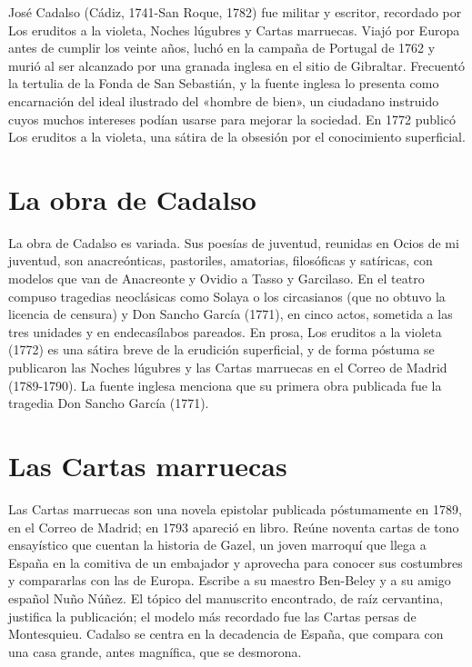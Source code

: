 \documentclass{book}
\begin{document}
José Cadalso (Cádiz, 1741-San Roque, 1782) fue militar y escritor, recordado por Los eruditos a la violeta, Noches lúgubres y Cartas marruecas. Viajó por Europa antes de cumplir los veinte años, luchó en la campaña de Portugal de 1762 y murió al ser alcanzado por una granada inglesa en el sitio de Gibraltar. Frecuentó la tertulia de la Fonda de San Sebastián, y la fuente inglesa lo presenta como encarnación del ideal ilustrado del «hombre de bien», un ciudadano instruido cuyos muchos intereses podían usarse para mejorar la sociedad. En 1772 publicó Los eruditos a la violeta, una sátira de la obsesión por el conocimiento superficial.


\section{La obra de Cadalso}

La obra de Cadalso es variada. Sus poesías de juventud, reunidas en Ocios de mi juventud, son anacreónticas, pastoriles, amatorias, filosóficas y satíricas, con modelos que van de Anacreonte y Ovidio a Tasso y Garcilaso. En el teatro compuso tragedias neoclásicas como Solaya o los circasianos (que no obtuvo la licencia de censura) y Don Sancho García (1771), en cinco actos, sometida a las tres unidades y en endecasílabos pareados. En prosa, Los eruditos a la violeta (1772) es una sátira breve de la erudición superficial, y de forma póstuma se publicaron las Noches lúgubres y las Cartas marruecas en el Correo de Madrid (1789-1790). La fuente inglesa menciona que su primera obra publicada fue la tragedia Don Sancho García (1771).


\section{Las Cartas marruecas}

Las Cartas marruecas son una novela epistolar publicada póstumamente en 1789, en el Correo de Madrid; en 1793 apareció en libro. Reúne noventa cartas de tono ensayístico que cuentan la historia de Gazel, un joven marroquí que llega a España en la comitiva de un embajador y aprovecha para conocer sus costumbres y compararlas con las de Europa. Escribe a su maestro Ben-Beley y a su amigo español Nuño Núñez. El tópico del manuscrito encontrado, de raíz cervantina, justifica la publicación; el modelo más recordado fue las Cartas persas de Montesquieu. Cadalso se centra en la decadencia de España, que compara con una casa grande, antes magnífica, que se desmorona.
\end{document}
